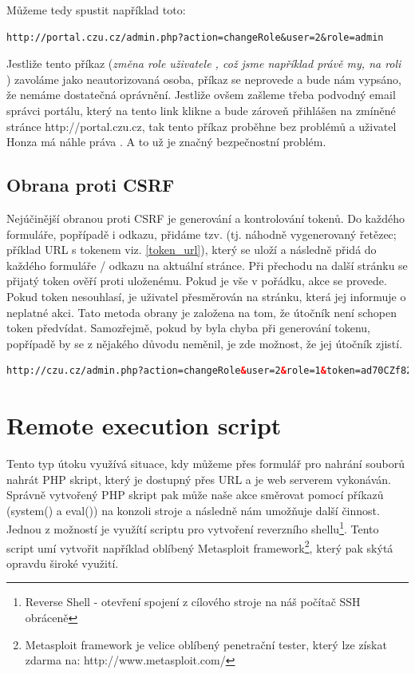 \documentclass[12pt, a4paper]{report}
\begin{document}
Můžeme tedy spustit například toto:
\begin{lstlisting}[label=csfr_example1,caption=URL změny uživatelské role]
http://portal.czu.cz/admin.php?action=changeRole&user=2&role=admin
\end{lstlisting}

Jestliže tento příkaz (\textit{změna role uživatele , což jsme například právě my, na roli }) zavoláme jako neautorizovaná osoba, příkaz se neprovede a bude nám vypsáno, že nemáme dostatečná oprávnění. Jestliže ovšem zašleme třeba podvodný email správci portálu, který na tento link klikne a bude zároveň přihlášen na zmíněné stránce {http://portal.czu.cz}, tak tento příkaz proběhne bez problémů a uživatel Honza má náhle práva . A to už je značný bezpečnostní problém.

\subsection{Obrana proti CSRF}
Nejúčinější obranou proti CSRF je generování a kontrolování tokenů. Do každého formuláře, popřípadě i odkazu, přidáme tzv.  (tj. náhodně vygenerovaný řetězec; příklad URL s tokenem viz. \ref{token_url}), který se uloží a následně přidá do každého formuláře / odkazu na aktuální stránce. Při přechodu na další stránku se přijatý token ověří proti uloženému. Pokud je vše v pořádku, akce se provede. Pokud token nesouhlasí, je uživatel přesměrován na  stránku, která jej informuje o neplatné akci. Tato metoda obrany je založena na tom, že útočník není schopen token předvídat. Samozřejmě, pokud by byla chyba při generování tokenu, popřípadě by se z nějakého důvodu neměnil, je zde možnost, že jej útočník zjistí.

\begin{lstlisting}[label=token_url,language=HTML, caption=CSRF obrana - token]
http://czu.cz/admin.php?action=changeRole&user=2&role=1&token=ad70CZf82
\end{lstlisting}

\section{Remote execution script}
Tento typ útoku využívá situace, kdy můžeme přes formulář pro nahrání souborů nahrát PHP skript, který je dostupný přes URL a je web serverem vykonáván. Správně vytvořený PHP skript pak může naše akce směrovat pomocí příkazů (system() a eval()) na konzoli stroje a následně nám umožňuje další činnost. Jednou z možností je využítí scriptu pro vytvoření reverzního shellu\footnote{Reverse Shell - otevření spojení z cílového stroje na náš počítač  SSH obráceně}. Tento script umí vytvořit například oblíbený Metasploit framework\footnote{Metasploit framework je velice oblíbený penetrační tester, který lze získat zdarma na: http://www.metasploit.com/}, který pak skýtá opravdu široké využití.
\end{document}
